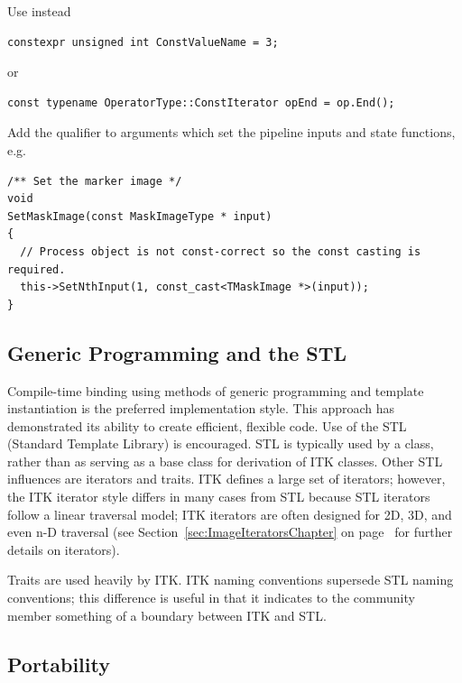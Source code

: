 Use instead

\small
\begin{verbatim}
constexpr unsigned int ConstValueName = 3;
\end{verbatim}
\normalsize

or

\small
\begin{verbatim}
const typename OperatorType::ConstIterator opEnd = op.End();
\end{verbatim}
\normalsize

Add the  qualifier to arguments which set the pipeline inputs and
state functions, e.g.
\small
\begin{verbatim}
/** Set the marker image */
void
SetMaskImage(const MaskImageType * input)
{
  // Process object is not const-correct so the const casting is required.
  this->SetNthInput(1, const_cast<TMaskImage *>(input));
}
\end{verbatim}
\normalsize


\subsection{Generic Programming and the STL}%
\label{subsec:GenericProgrammingAndSTL}

Compile-time binding using methods of generic programming and template
instantiation is the preferred implementation style. This approach has
demonstrated its ability to create efficient, flexible code. Use of the STL
(Standard Template Library) is encouraged. STL is typically used by a class,
rather than as serving as a base class for derivation of ITK classes. Other
STL influences are iterators and traits. ITK defines a large set of iterators;
however, the ITK iterator style differs in many cases from STL because STL
iterators follow a linear traversal model; ITK iterators are often designed for
2D, 3D, and even n-D traversal (see Section~\ref{sec:ImageIteratorsChapter} on
page~\pageref{sec:ImageIteratorsChapter} for further details on iterators).

Traits are used heavily by ITK. ITK naming conventions supersede STL naming
conventions; this difference is useful in that it indicates to the community
member something of a boundary between ITK and STL.


\subsection{Portability}%
\label{subsec:Portability}

